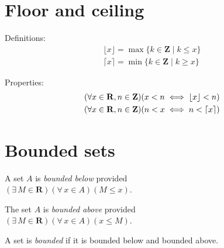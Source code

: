 \documentclass[letterpaper,landscape,9pt,fleqn]{extarticle}
\newcommand{\reals}{\mathbf{R}}
\newcommand{\integers}{\mathbf{Z}}
\DeclarePairedDelimiter{\parens}{\lparen}{\rparen}
\begin{document}
\begin{multicols*}{3}
\section*{Floor and ceiling}
\vspace{-0.1in}
\noindent Definitions:
\begin{align*}
    \lfloor x \rfloor = \max \{k \in \integers \mid  k \leq x \} \\
    \lceil x \rceil = \min  \{k \in \integers \mid  k \geq x \}   
\end{align*}

\noindent Properties:
\begin{align*}
   & \parens*{\forall x \in \reals, n \in \integers} \parens*{x < n \iff  \lfloor x \rfloor < n}\\
   & \parens*{\forall x \in \reals, n \in \integers} \parens*{n < x \iff  n < \lceil  x \rceil}\\
\end{align*}
\vspace{-0.51in} 
\section*{Bounded sets}
\begin{description}[\itemsep=0em]
    \item[Bounded below] A set $A$ is \emph{bounded below} provided\\
        \((\exists \, M \in \reals)(\forall \, x \in A)(M \leq x)\).

    \item[Bounded above] The set $A$ is \emph{bounded above} provided\\
        \((\exists \, M \in \reals)(\forall \, x \in A)(x \leq M ) \).
        
    \item[Bounded] A set is \emph{bounded} if it is bounded below and bounded above.

\end{description}


\end{multicols*}
\end{document}
